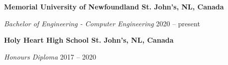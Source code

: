\textbf{Memorial University of Newfoundland \hfill St. John's, NL, Canada} \par
\textit{Bachelor of Engineering - Computer Engineering} \hfill 2020 -- present\par
\textbf{Holy Heart High School \hfill St. John's, NL, Canada} \par
\textit{Honours Diploma} \hfill 2017 -- 2020\par